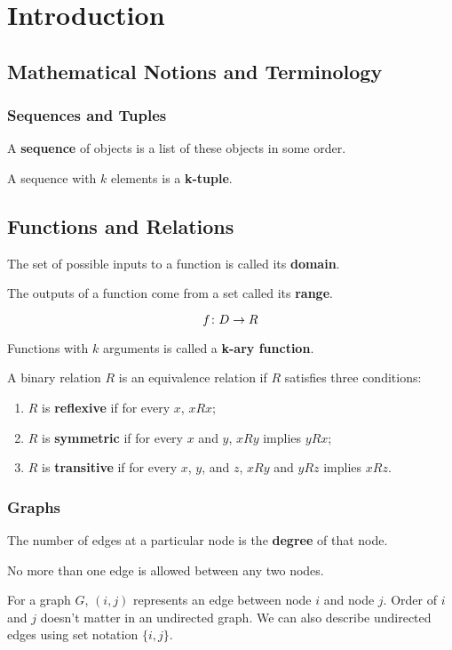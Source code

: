 \section{Introduction}


\subsection{Mathematical Notions and Terminology}

\subsubsection{Sequences and Tuples}

A \textbf{sequence} of objects is a list of these objects in some order.

A sequence with $k$ elements is a \textbf{k-tuple}.

\subsection*{Functions and Relations}

The set of possible inputs to a function is called its \textbf{domain}.

The outputs of a function come from a set called its \textbf{range}.

\[
f\colon D\rightarrow R
\]

Functions with $k$ arguments is called a \textbf{k-ary function}.

A binary relation $R$ is an equivalence relation if $R$ satisfies three conditions:
\begin{enumerate}
\item $R$ is \textbf{reflexive} if for every $x$, $xRx$;
\item $R$ is \textbf{symmetric} if for every $x$ and $y$, $xRy$ implies $yRx$;
\item $R$ is \textbf{transitive} if for every $x$, $y$, and $z$, $xRy$ and $yRz$ implies $xRz$.
\end{enumerate}

\subsubsection{Graphs}

The number of edges at a particular node is the \textbf{degree} of that node.

No more than one edge is allowed between any two nodes.

For a graph $G$, $(i, j)$ represents an edge between node $i$ and node $j$. Order of $i$ and $j$ doesn't matter in an undirected graph. We can also describe undirected edges using set notation $\{i, j\}$.

